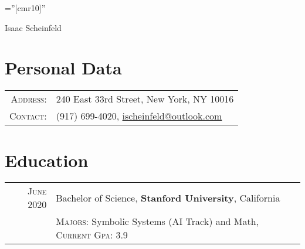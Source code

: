 \documentclass[letterpaper,10pt]{article}
\begin{document}

\pagestyle{empty} %

\font\fb=''[cmr10]'' %

\vspace*{1mm}
\par{\centering
		{\Huge Isaac Scheinfeld %
	}\bigskip\par}

\vspace*{1mm}
\section{Personal Data}

\begin{tabular}{rl}
    \textsc{Address:}   & 240 East 33rd Street, New York, NY 10016\\
    \textsc{Contact:}     & (917) 699-4020, \href{mailto:ischeinfeld@outlook.com}{ischeinfeld@outlook.com}
\end{tabular}

\vspace*{1mm}
\section{Education}
\begin{tabular}{rl}
 \textsc{June} 2020 & Bachelor of Science, \textbf{Stanford University}, California\\
& \small\textsc{Majors:} Symbolic Systems (AI Track) and Math, \small\textsc{Current Gpa:} 3.9\\
\end{tabular}

\vspace*{1mm}
\end{document}
